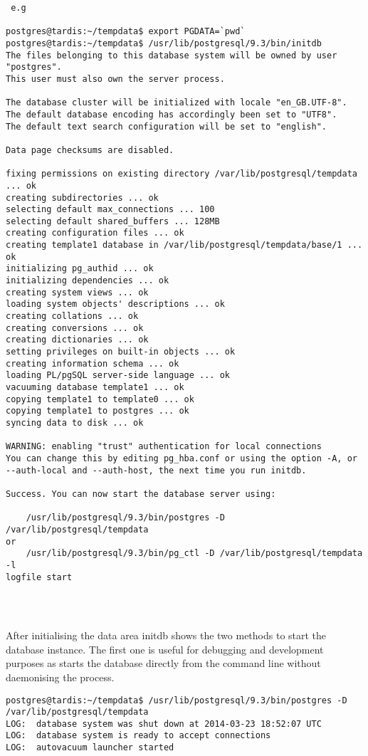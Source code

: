 \begin{verbatim}
 e.g
 
postgres@tardis:~/tempdata$ export PGDATA=`pwd`
postgres@tardis:~/tempdata$ /usr/lib/postgresql/9.3/bin/initdb 
The files belonging to this database system will be owned by user "postgres".
This user must also own the server process.

The database cluster will be initialized with locale "en_GB.UTF-8".
The default database encoding has accordingly been set to "UTF8".
The default text search configuration will be set to "english".

Data page checksums are disabled.

fixing permissions on existing directory /var/lib/postgresql/tempdata ... ok
creating subdirectories ... ok
selecting default max_connections ... 100
selecting default shared_buffers ... 128MB
creating configuration files ... ok
creating template1 database in /var/lib/postgresql/tempdata/base/1 ... ok
initializing pg_authid ... ok
initializing dependencies ... ok
creating system views ... ok
loading system objects' descriptions ... ok
creating collations ... ok
creating conversions ... ok
creating dictionaries ... ok
setting privileges on built-in objects ... ok
creating information schema ... ok
loading PL/pgSQL server-side language ... ok
vacuuming database template1 ... ok
copying template1 to template0 ... ok
copying template1 to postgres ... ok
syncing data to disk ... ok

WARNING: enabling "trust" authentication for local connections
You can change this by editing pg_hba.conf or using the option -A, or
--auth-local and --auth-host, the next time you run initdb.

Success. You can now start the database server using:

    /usr/lib/postgresql/9.3/bin/postgres -D /var/lib/postgresql/tempdata
or
    /usr/lib/postgresql/9.3/bin/pg_ctl -D /var/lib/postgresql/tempdata -l 
logfile start

 
 
\end{verbatim}

After initialising the data area initdb shows the two methods to start the 
database instance. The first one is useful for debugging and development 
purposes as starts the database directly from the command line without 
daemonising the process.

\begin{verbatim}
postgres@tardis:~/tempdata$ /usr/lib/postgresql/9.3/bin/postgres -D 
/var/lib/postgresql/tempdata
LOG:  database system was shut down at 2014-03-23 18:52:07 UTC
LOG:  database system is ready to accept connections
LOG:  autovacuum launcher started

\end{verbatim}

